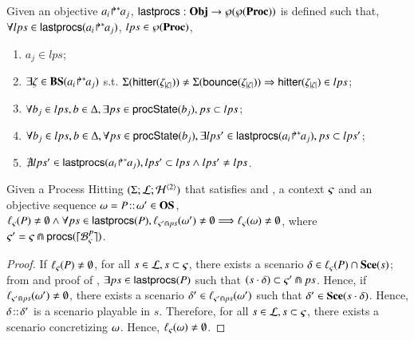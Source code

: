 \begin{definition}[$\lastprocs$]
\label{def:lastprocs}
Given an objective ${a_i\!\Rsh^*\!\!a_j}$, $\mathsf{lastprocs}:
\mathbf{Obj}\to\wp(\wp(\mathbf{Proc}))$ is
defined such that, $\forall lps\in\mathsf{lastprocs}({a_i\!\Rsh^*\!\!a_j})$, 
$lps\in\wp(\mathbf{Proc})$,
\begin{enumerate}
\item $a_j\in lps$;
\item $\exists\zeta\in\mathbf{BS}({a_i\!\Rsh^*\!\!a_j})$ s.t.
 $\Sigma(\mathsf{hitter}(\zeta_{|\zeta|})) \neq 
		\Sigma(\mathsf{bounce}(\zeta_{|\zeta|}))
		 \Rightarrow
		  \mathsf{hitter}(\zeta_{|\zeta|})\in lps$;
\item $\forall b_j\in lps, b\in\Delta, \exists ps\in\mathsf{procState}(b_j), ps\subset lps$;
\item $\forall b_j\in lps, b\in\Delta, 
		\forall ps\in\mathsf{procState}(b_j),
			\exists lps'\in\mathsf{lastprocs}({a_i\!\Rsh^*\!\!a_j}),
				ps\subset lps'$;
\item $\nexists lps'\in\mathsf{lastprocs}({a_i\!\Rsh^*\!\!a_j}), lps'\subset lps \wedge
									lps'\neq lps$.
\end{enumerate}
\end{definition}

\begin{theorem}
\label{thm:ordered-ua}
Given a Process Hitting $(\Sigma; \mathcal{L}; \mathcal{H}^{\langle 2 \rangle})$
that satisfies  and ,
a context $\varsigma$ and an objective sequence $\omega =
P\!::\!\omega'\in\mathbf{OS}$,
$\ell_\varsigma(P)\neq\emptyset \wedge
	\forall ps \in\mathsf{lastprocs}(P),
	\ell_{\varsigma'\Cap ps}(\omega')\neq\emptyset
	\Longrightarrow \ell_\varsigma(\omega)\neq\emptyset$,
where $\varsigma' = \varsigma\Cap\mathsf{procs}(\lceil \mathcal{B}_{\varsigma}^{P}\rceil)$.
\end{theorem}
\begin{proof}
If $\ell_\varsigma(P)\neq\emptyset$,
for all $s\in \mathcal{L}, s\subset\varsigma$,
there exists a scenario $\delta\in\ell_\varsigma(P)\cap\mathbf{Sce}(s)$;
from  and proof of ,
$\exists ps\in\mathsf{lastprocs}(P)$ such that
$(s\cdot\delta)\subset\varsigma'\Cap ps$.
Hence, if $\ell_{\varsigma'\Cap ps}(\omega')\neq\emptyset$,
there exists a scenario $\delta'\in\ell_{\varsigma'\Cap ps}(\omega')$ such that
$\delta'\in\mathbf{Sce}(s\cdot\delta)$.
Hence, $\delta\!::\!\delta'$ is a scenario playable in $s$.
Therefore, for all $s\in \mathcal{L}, s\subset\varsigma$, there exists a scenario
concretizing $\omega$.
Hence, $\ell_\varsigma(\omega)\neq\emptyset$.
\end{proof}


